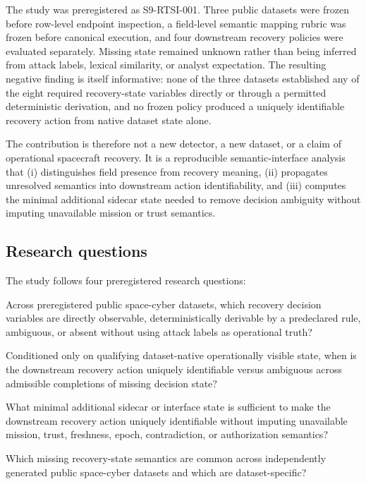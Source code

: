 \documentclass[preprint,12pt]{elsarticle}
\begin{document}
The study was preregistered as S9-RTSI-001. Three public datasets were frozen before row-level endpoint inspection, a field-level semantic mapping rubric was frozen before canonical execution, and four downstream recovery policies were evaluated separately. Missing state remained unknown rather than being inferred from attack labels, lexical similarity, or analyst expectation. The resulting negative finding is itself informative: none of the three datasets established any of the eight required recovery-state variables directly or through a permitted deterministic derivation, and no frozen policy produced a uniquely identifiable recovery action from native dataset state alone.

The contribution is therefore not a new detector, a new dataset, or a claim of operational spacecraft recovery. It is a reproducible semantic-interface analysis that (i) distinguishes field presence from recovery meaning, (ii) propagates unresolved semantics into downstream action identifiability, and (iii) computes the minimal additional sidecar state needed to remove decision ambiguity without imputing unavailable mission or trust semantics.

\subsection{Research questions}

The study follows four preregistered research questions:

\begin{description}[leftmargin=1.15cm,labelwidth=0.95cm,style=nextline]
    \item[RQ1] Across preregistered public space-cyber datasets, which recovery decision variables are directly observable, deterministically derivable by a predeclared rule, ambiguous, or absent without using attack labels as operational truth?
    \item[RQ2] Conditioned only on qualifying dataset-native operationally visible state, when is the downstream recovery action uniquely identifiable versus ambiguous across admissible completions of missing decision state?
    \item[RQ3] What minimal additional sidecar or interface state is sufficient to make the downstream recovery action uniquely identifiable without imputing unavailable mission, trust, freshness, epoch, contradiction, or authorization semantics?
    \item[RQ4] Which missing recovery-state semantics are common across independently generated public space-cyber datasets and which are dataset-specific?
\end{description}
\end{document}

